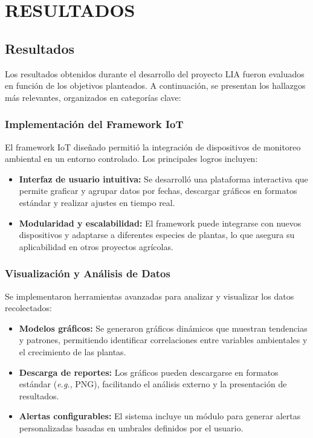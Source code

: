 \chapter{RESULTADOS}

\section{Resultados}

Los resultados obtenidos durante el desarrollo  del proyecto LIA fueron evaluados en función de los objetivos planteados. A continuación, se presentan los hallazgos más relevantes, organizados en categorías clave:

\subsection{Implementación del Framework IoT}
El framework IoT diseñado permitió la integración de dispositivos de monitoreo ambiental en un entorno controlado. Los principales logros incluyen:
\begin{itemize}
    \item \textbf{Interfaz de usuario intuitiva:} Se desarrolló una plataforma interactiva que permite graficar y agrupar datos por fechas, descargar gráficos en formatos estándar y realizar ajustes en tiempo real.
    \item \textbf{Modularidad y escalabilidad:} El framework puede integrarse con nuevos dispositivos y adaptarse a diferentes especies de plantas, lo que asegura su aplicabilidad en otros proyectos agrícolas.
\end{itemize}

\subsection{Visualización y Análisis de Datos}
Se implementaron herramientas avanzadas para analizar y visualizar los datos recolectados:
\begin{itemize}
    \item \textbf{Modelos gráficos:} Se generaron gráficos dinámicos que muestran tendencias y patrones, permitiendo identificar correlaciones entre variables ambientales y el crecimiento de las plantas.
    \item \textbf{Descarga de reportes:} Los gráficos pueden descargarse en formatos estándar (\textit{e.g.}, PNG), facilitando el análisis externo y la presentación de resultados.
    \item \textbf{Alertas configurables:} El sistema incluye un módulo para generar alertas personalizadas basadas en umbrales definidos por el usuario.
\end{itemize}


